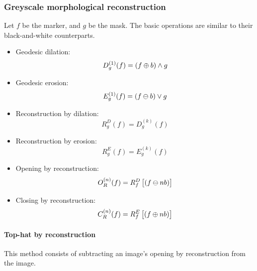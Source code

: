 \subsubsection{Greyscale morphological reconstruction}
Let $f$ be the marker, and $g$ be the mask. The basic operations are similar to their black-and-white counterparts.
\begin{itemize}
    \item Geodesic dilation:
    \begin{equation}
        D_g^{(1)}(f) = (f \oplus b) \wedge g
    \end{equation}
    \item Geodesic erosion:
    \begin{equation}
        E_g^{(1)}(f) = (f \ominus b) \vee g
    \end{equation}
    \item Reconstruction by dilation:
    \begin{equation}
        R_g^D(f) = D_g^{(k)}(f)
    \end{equation}
    \item Reconstruction by erosion:
    \begin{equation}
        R_g^E(f) = E_g^{(k)}(f)
    \end{equation}
    \item Opening by reconstruction:
    \begin{equation}
        O_R^{(n)}(f) = R_f^D \left[ (f \ominus nb) \right]
    \end{equation}
    \item Closing by reconstruction:
    \begin{equation}
        C_R^{(n)}(f) = R_f^E \left[ (f \oplus nb) \right]
    \end{equation}
\end{itemize}

\paragraph{Top-hat by reconstruction}
This method consists of subtracting an image's opening by reconstruction from the image.
